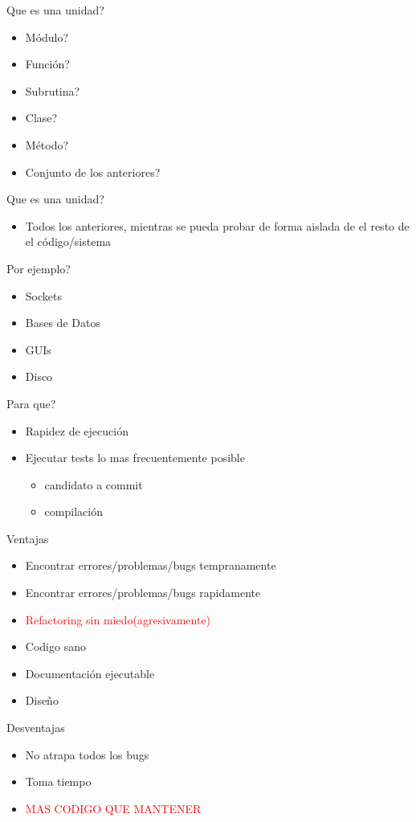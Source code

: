 
\begin{frame}{Que es una unidad?}
    \begin{itemize}
        \item Módulo?
        \item Función?
        \item Subrutina?
        \item Clase?
        \item Método?
        \item Conjunto de los anteriores?
    \end{itemize}
\end{frame}

\begin{frame}{Que es una unidad?}
    \begin{itemize}
        \item Todos los anteriores, mientras se pueda probar de forma aislada de el resto de el código/sistema
    \end{itemize}
\end{frame}

\begin{frame}{Por ejemplo?}
    \begin{itemize}
        \item Sockets
        \item Bases de Datos
        \item GUIs
        \item Disco
    \end{itemize}
\end{frame}

\begin{frame}{Para que?}
    \begin{itemize}
        \item Rapidez de ejecución
        \item Ejecutar tests lo mas frecuentemente posible
        \begin{itemize}
            \item candidato a commit
            \item compilación
        \end{itemize}
    \end{itemize}
\end{frame}

\begin{frame}{Ventajas}
    \begin{itemize}
        \item Encontrar errores/problemas/bugs tempranamente
        \item Encontrar errores/problemas/bugs rapidamente
        \item \textcolor{red}{Refactoring sin miedo(agresivamente)}
        \item Codigo sano
        \item Documentación ejecutable
        \item Diseño
    \end{itemize}
\end{frame}

\begin{frame}{Desventajas}
    \begin{itemize}
        \item No atrapa todos los bugs
        \item Toma tiempo
        \item \textcolor{red}{MAS CODIGO QUE MANTENER}
    \end{itemize}
\end{frame}


